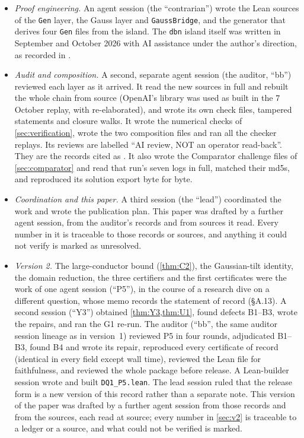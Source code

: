 \documentclass[11pt]{article}
\theoremstyle{definition}
\newcommand{\lean}[1]{\texttt{#1}}
\begin{document}
\begin{itemize}
\item \emph{Proof engineering.} An agent session (the ``contrarian'') wrote the Lean sources of the \lean{Gen} layer, the Gauss layer and \lean{GaussBridge}, and the generator that derives four \lean{Gen} files from the island. The \lean{dbn} island itself was written in September and October 2026 with AI assistance under the author's direction, as recorded in \cite{Murphy932,MurphyNewman}.
\item \emph{Audit and composition.} A second, separate agent session (the auditor, ``bb'') reviewed each layer as it arrived. It read the new sources in full and rebuilt the whole chain from source (OpenAI's library was used as built in the 7 October replay, with  re-elaborated), and wrote its own check files, tampered statements and closure walks. It wrote the numerical checks of \cref{sec:verification}, wrote the two composition files and ran all the checker replays. Its reviews are labelled ``AI review, NOT an operator read-back''. They are the records cited as \cite{bbrecords}. It also wrote the Comparator challenge files of \cref{sec:comparator} and read that run's seven logs in full, matched their md5s, and reproduced its solution export byte for byte.
\item \emph{Coordination and this paper.} A third session (the ``lead'') coordinated the work and wrote the publication plan. This paper was drafted by a further agent session, from the auditor's records and from sources it read. Every number in it is traceable to those records or sources, and anything it could not verify is marked as unresolved.
\item \emph{Version 2.} The large-conductor bound (\cref{thm:C2}), the Gaussian-tilt identity, the domain reduction, the three certifiers and the first certificates were the work of one agent session (``P5''), in the course of a research dive on a different question, whose memo records the statement of record (\S A.13). A second session (``Y3'') obtained \cref{thm:Y3,thm:U1}, found defects B1--B3, wrote the repairs, and ran the G1 re-run. The auditor (``bb'', the same auditor session lineage as in version~1) reviewed P5 in four rounds, adjudicated B1--B3, found B4 and wrote its repair, reproduced every certificate of record (identical in every field except wall time), reviewed the Lean file for faithfulness, and reviewed the whole package before release. A Lean-builder session wrote and built \lean{DQ1\_P5.lean}. The lead session ruled that the release form is a new version of this record rather than a separate note. This version of the paper was drafted by a further agent session from those records and from the sources, each read at source; every number in \cref{sec:v2} is traceable to a ledger or a source, and what could not be verified is marked.

\end{itemize}
\end{document}
